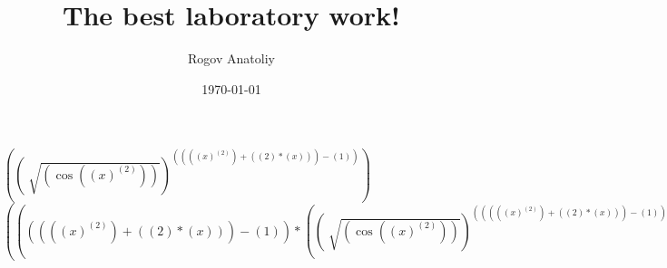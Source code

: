 \documentclass[12pt, letterpaper]{article}
\title{The best laboratory work!}
\author{Rogov Anatoliy}
\date{\today}
\begin{document}
\maketitle
\newpage
$({(\sqrt[]{(\cos{({(x)}^{(2)})})})}^{({({({(x)}^{(2)})}+{({(2)}*{(x)})})}-{(1)})})$\\
$({({({({({(x)}^{(2)})}+{({(2)}*{(x)})})}-{(1)})}*{({(\sqrt[]{(\cos{({(x)}^{(2)})})})}^{({({({({(x)}^{(2)})}+{({(2)}*{(x)})})}-{(1)})}-{(1)})})})}*{({\frac{(1)}{({(2)}*{(\sqrt[]{(\cos{({(x)}^{(2)})})})})}}*{({({(\sin{({(x)}^{(2)})})}*{(-1)})}*{({({(2)}*{({(x)}^{({(2)}-{(1)})})})}*{(1)})})})})$\\
\end{document}
